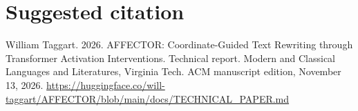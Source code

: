 \documentclass[manuscript,screen,nonacm]{acmart}
\begin{document}



\section*{Suggested citation}
William Taggart. 2026. AFFECTOR: Coordinate-Guided Text Rewriting
through Transformer Activation Interventions. Technical report. Modern
and Classical Languages and Literatures, Virginia Tech. ACM manuscript
edition, November 13, 2026.
\url{https://huggingface.co/will-taggart/AFFECTOR/blob/main/docs/TECHNICAL_PAPER.md}
\end{document}
